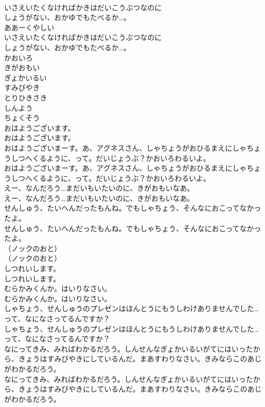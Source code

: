 \documentclass[8pt]{extreport}
\begin{document}
\begin{CJK}{UTF8}{min}
\\	いさえいたくなければかきはだいこうぶつなのに
\\	しょうがない、おかゆでもたべるか…。
\\	ああーくやしい
\\	いさえいたくなければかきはだいこうぶつなのに
\\	しょうがない、おかゆでもたべるか…。
\\	かおいろ
\\	きがおもい
\\	ぎょかいるい
\\	すみびやき
\\	とりひきさき
\\	しんよう
\\	ちょくそう
\\	おはようございます。
\\	おはようございます。
\\	おはようございまーす。あ、アグネスさん、しゃちょうがおひるまえにしゃちょうしつへくるように、って。だいじょうぶ？かおいろわるいよ。
\\	おはようございまーす。あ、アグネスさん、しゃちょうがおひるまえにしゃちょうしつへくるように、って。だいじょうぶ？かおいろわるいよ。
\\	えー、なんだろう…まだいもいたいのに、きがおもいなあ。
\\	えー、なんだろう…まだいもいたいのに、きがおもいなあ。
\\	せんしゅう、たいへんだったもんね。でもしゃちょう、そんなにおこってなかったよ。
\\	せんしゅう、たいへんだったもんね。でもしゃちょう、そんなにおこってなかったよ。
\\	（ノックのおと）
\\	（ノックのおと）
\\	しつれいします。
\\	しつれいします。
\\	むらかみくんか。はいりなさい。
\\	むらかみくんか。はいりなさい。
\\	しゃちょう、せんしゅうのプレゼンはほんとうにもうしわけありませんでした…って、なになさってるんですか？
\\	しゃちょう、せんしゅうのプレゼンはほんとうにもうしわけありませんでした…って、なになさってるんですか？
\\	なにってきみ、みればわかるだろう。しんせんなぎょかいるいがてにはいったから、きょうはすみびやきにしているんだ。まあすわりなさい。きみならこのあじがわかるだろう。
\\	なにってきみ、みればわかるだろう。しんせんなぎょかいるいがてにはいったから、きょうはすみびやきにしているんだ。まあすわりなさい。きみならこのあじがわかるだろう。

\end{CJK}
\end{document}
